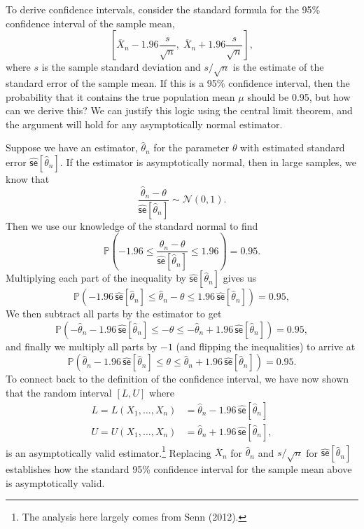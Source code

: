 \documentclass[
  letterpaper,
  DIV=11,
  numbers=noendperiod]{scrreprt}
\newcommand{\N}{\mathcal{N}}
\newcommand{\se}{\textsf{se}}
\renewcommand{\P}{\mathbb{P}}
\newcommand{\Xbar}{\overline{X}}
\theoremstyle{plain}
\theoremstyle{definition}
\theoremstyle{definition}
\theoremstyle{remark}
\begin{document}
To derive confidence intervals, consider the standard formula for the
95\% confidence interval of the sample mean, \[ 
\left[\Xbar_n - 1.96\frac{s}{\sqrt{n}},\; \Xbar_n + 1.96\frac{s}{\sqrt{n}}\right],
\] where \(s\) is the sample standard deviation and \(s/\sqrt{n}\) is
the estimate of the standard error of the sample mean. If this is a 95\%
confidence interval, then the probability that it contains the true
population mean \(\mu\) should be 0.95, but how can we derive this? We
can justify this logic using the central limit theorem, and the argument
will hold for any asymptotically normal estimator.

Suppose we have an estimator, \(\widehat{\theta}_n\) for the parameter
\(\theta\) with estimated standard error
\(\widehat{\se}[\widehat{\theta}_n]\). If the estimator is
asymptotically normal, then in large samples, we know that \[ 
\frac{\widehat{\theta}_n - \theta}{\widehat{\se}[\widehat{\theta}_n]} \sim \N(0, 1).
\] Then we use our knowledge of the standard normal to find \[ 
\P\left( -1.96 \leq \frac{\widehat{\theta}_n - \theta}{\widehat{\se}[\widehat{\theta}_n]} \leq 1.96\right) = 0.95.
\] Multiplying each part of the inequality by
\(\widehat{\se}[\widehat{\theta}_n]\) gives us \[ 
\P\left( -1.96\,\widehat{\se}[\widehat{\theta}_n] \leq \widehat{\theta}_n - \theta \leq 1.96\,\widehat{\se}[\widehat{\theta}_n]\right) = 0.95,
\] We then subtract all parts by the estimator to get \[ 
\P\left(-\widehat{\theta}_n - 1.96\,\widehat{\se}[\widehat{\theta}_n] \leq - \theta \leq -\widehat{\theta}_n + 1.96\,\widehat{\se}[\widehat{\theta}_n]\right) = 0.95,
\] and finally we multiply all parts by \(-1\) (and flipping the
inequalities) to arrive at \[ 
\P\left(\widehat{\theta}_n - 1.96\,\widehat{\se}[\widehat{\theta}_n] \leq \theta \leq \widehat{\theta}_n + 1.96\,\widehat{\se}[\widehat{\theta}_n]\right) = 0.95.
\] To connect back to the definition of the confidence interval, we have
now shown that the random interval \([L, U]\) where \[ 
\begin{aligned}
  L = L(X_1, \ldots, X_n) &= \widehat{\theta}_n - 1.96\,\widehat{\se}[\widehat{\theta}_n] \\
  U = U(X_1, \ldots, X_n) &= \widehat{\theta}_n + 1.96\,\widehat{\se}[\widehat{\theta}_n],
\end{aligned}
\] is an asymptotically valid estimator.\footnote{The analysis here
  largely comes from Senn (2012).} Replacing \(\Xbar_n\) for
\(\widehat{\theta}_n\) and \(s/\sqrt{n}\) for
\(\widehat{\se}[\widehat{\theta}_n]\) establishes how the standard 95\%
confidence interval for the sample mean above is asymptotically valid.
\end{document}
